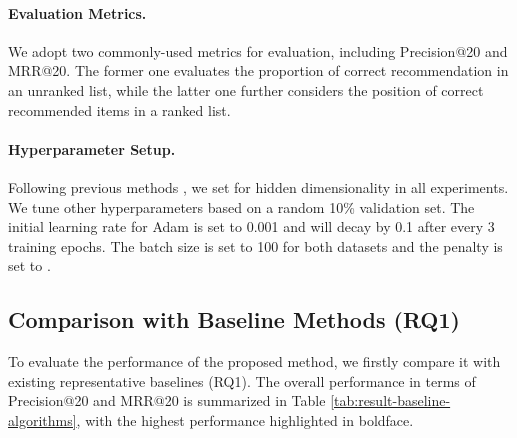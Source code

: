 \documentclass[sigconf]{acmart}
\begin{document}
\paragraph{Evaluation Metrics.}
We adopt two commonly-used metrics for evaluation, including Precision@20 and MRR@20. The former one evaluates the proportion of correct recommendation in an unranked list, while the latter one further considers the position of correct recommended items in a ranked list.

\paragraph{Hyperparameter Setup.}
Following previous methods \cite{Liu:2018er,Wu:2019ke}, we set  for hidden dimensionality in all experiments. We tune other hyperparameters based on a random 10\% validation set. The initial learning rate for Adam is set to 0.001 and will decay by 0.1 after every 3 training epochs. The batch size is set to 100 for both datasets and the  penalty is set to .

\subsection{Comparison with Baseline Methods (RQ1)}
To evaluate the performance of the proposed method, we firstly compare it with existing representative baselines (RQ1). The overall performance in terms of Precision@20 and MRR@20 is summarized in Table \ref{tab:result-baseline-algorithms}, with the highest performance highlighted in boldface.
\end{document}
